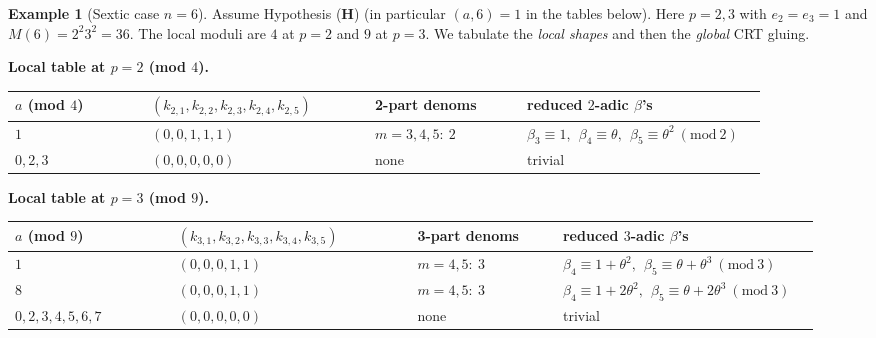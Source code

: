 \documentclass[12pt,a4paper,oneside]{amsart}
\theoremstyle{definition}
\newtheorem{example}[theorem]{Example}
\begin{document}
\begin{example}[Sextic case $n=6$]\label{ex:Sextic-shape}
Assume Hypothesis (\textbf{H}) (in particular $(a,6)=1$ in the tables below). Here $p=2,3$ with $e_2=e_3=1$ and $M(6)=2^{2}3^{2}=36$. The local moduli are $4$ at $p=2$ and $9$ at $p=3$. We tabulate the \emph{local shapes} and then the \emph{global} CRT gluing.

\noindent\textbf{Local table at \(p=2\) (mod \(4\)).}
\begin{center}
\small
\setlength{\tabcolsep}{4pt}
\renewcommand{\arraystretch}{1.15}
\begin{tabular}{@{}p{0.17\linewidth} p{0.28\linewidth} p{0.19\linewidth} p{0.30\linewidth}@{}}
\hline
\textbf{$a$ (mod $4$)} &
\textbf{$(k_{2,1},k_{2,2},k_{2,3},k_{2,4},k_{2,5})$} &
\textbf{2-part denoms} &
\textbf{reduced $2$-adic $\beta$'s}\\
\hline
$1$ & $(0,0,1,1,1)$ & $m=3,4,5:\ 2$ &
$\beta_3\equiv 1,\ \ \beta_4\equiv \theta,\ \ \beta_5\equiv \theta^2\ (\mathrm{mod}\ 2)$\\[2pt]
$0,2,3$ & $(0,0,0,0,0)$ & none & trivial\\
\hline
\end{tabular}
\end{center}

\noindent\textbf{Local table at \(p=3\) (mod \(9\)).}
\begin{center}
\small
\setlength{\tabcolsep}{4pt}
\renewcommand{\arraystretch}{1.15}
\begin{tabular}{@{}p{0.19\linewidth} p{0.28\linewidth} p{0.17\linewidth} p{0.30\linewidth}@{}}
\hline
\textbf{$a$ (mod $9$)} &
\textbf{$(k_{3,1},k_{3,2},k_{3,3},k_{3,4},k_{3,5})$} &
\textbf{3-part denoms} &
\textbf{reduced $3$-adic $\beta$'s}\\
\hline
$1$ & $(0,0,0,1,1)$ & $m=4,5:\ 3$ &
$\beta_4\equiv 1+\theta^2,\ \ \beta_5\equiv \theta+\theta^3\ (\mathrm{mod}\ 3)$\\[2pt]
$8$ & $(0,0,0,1,1)$ & $m=4,5:\ 3$ &
$\beta_4\equiv 1+2\theta^2,\ \ \beta_5\equiv \theta+2\theta^3\ (\mathrm{mod}\ 3)$\\[2pt]
$0,2,3,4,5,6,7$ & $(0,0,0,0,0)$ & none & trivial\\
\hline
\end{tabular}
\end{center}


\end{example}
\end{document}
